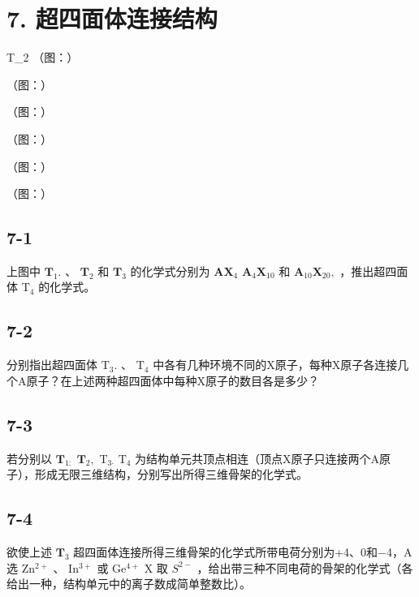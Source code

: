 \section*{7. 超四面体连接结构}
T_{2}
（图：）

（图：）

（图：）

（图：）

（图：）

（图：）

\subsection*{7-1}
上图中 $\mathbf { T } _ { 1 } .$ 、 $\mathbf { T } _ { 2 }$ 和 $\mathbf { T } _ { 3 }$ 的化学式分别为 $\mathbf { A X } _ { 4 }$ $\mathbf { A } _ { 4 } \mathbf { X } _ { 1 0 }$ 和 $\mathbf { A } _ { 1 0 } \mathbf { X } _ { 2 0 } ,$ ，推出超四⾯体 $\mathrm { T } _ { 4 }$ 的化学式。

\subsection*{7-2}
分别指出超四⾯体 $\mathrm { { T } _ { 3 } } .$ 、 $\mathrm { T } _ { 4 }$ 中各有⼏种环境不同的X原⼦，每种X原⼦各连接⼏个A原⼦？在上述两种超四⾯体中每种X原⼦的数⽬各是多少？

\subsection*{7-3}
若分别以 $\mathbf { T } _ { 1 \mathrm { : } }$ $\mathbf { T } _ { 2 } ,$ $\mathrm { { T } _ { 3 \mathrm { { \cdot } } } }$ $\mathrm { { T } _ { 4 } }$ 为结构单元共顶点相连（顶点X原⼦只连接两个A原⼦），形成⽆限三维结构，分别写出所得三维⻣架的化学式。

\subsection*{7-4}
欲使上述 $\mathbf { T } _ { 3 }$ 超四⾯体连接所得三维⻣架的化学式所带电荷分别为+4、0和−4，A选 $\mathrm { Z n ^ { 2 + } }$ 、 $\mathrm { I n ^ { 3 + } }$ 或 $\mathrm { G e ^ { 4 + } }$ X 取 $S ^ { 2 - }$ ，给出带三种不同电荷的⻣架的化学式（各给出⼀种，结构单元中的离⼦数成简单整数⽐）。
